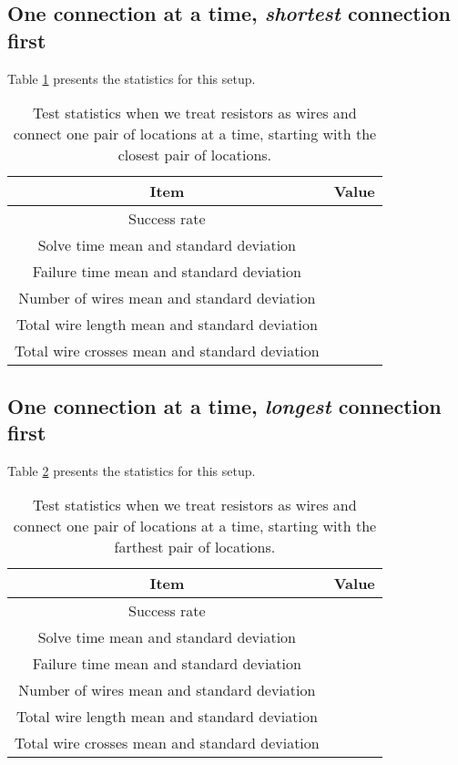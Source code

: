 \subsection{One connection at a time, \textit{shortest} connection first}

Table \ref{tb:as_wire_pair_s} presents the statistics for this setup.

\begin{table}[H]
\begin{center}
\begin{singlespace}
\begin{tabular}{| c | c |}
\hline
Item & Value \\
\hline\hline
Success rate & \\
Solve time mean and standard deviation & \\
Failure time mean and standard deviation & \\
Number of wires mean and standard deviation & \\
Total wire length mean and standard deviation & \\
Total wire crosses mean and standard deviation & \\
\hline
\end{tabular}
\end{singlespace}
\end{center}
\label{tb:as_wire_pair_s}
\caption{Test statistics when we treat resistors as wires and connect one
pair of locations at a time, starting with the closest pair of locations.}
\end{table}

\subsection{One connection at a time, \textit{longest} connection first}

Table \ref{tb:as_wire_pair_l} presents the statistics for this setup.

\begin{table}[H]
\begin{center}
\begin{singlespace}
\begin{tabular}{| c | c |}
\hline
Item & Value \\
\hline\hline
Success rate & \\
Solve time mean and standard deviation & \\
Failure time mean and standard deviation & \\
Number of wires mean and standard deviation & \\
Total wire length mean and standard deviation & \\
Total wire crosses mean and standard deviation & \\
\hline
\end{tabular}
\end{singlespace}
\end{center}
\label{tb:as_wire_pair_l}
\caption{Test statistics when we treat resistors as wires and connect one
pair of locations at a time, starting with the farthest pair of locations.}
\end{table}

